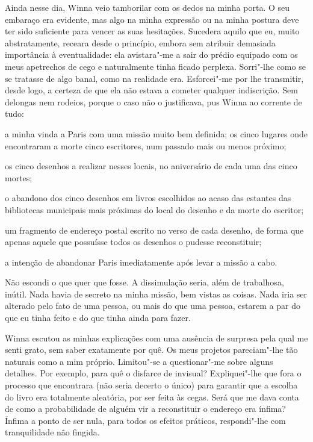 Ainda nesse dia, Winna veio tamborilar com os dedos na minha porta. O
seu embaraço era evidente, mas algo na minha expressão ou na minha
postura deve ter sido suficiente para vencer as suas hesitações.
Sucedera aquilo que eu, muito abstratamente, receara desde o princípio,
embora sem atribuir demasiada importância à eventualidade: ela avistara"-me
a sair do prédio equipado com os meus apetrechos de cego e
naturalmente tinha ficado perplexa. Sorri"-lhe como se se tratasse de
algo banal, como na realidade era. Esforcei"-me por lhe transmitir, desde
logo, a certeza de que ela não estava a cometer qualquer indiscrição.
Sem delongas nem rodeios, porque o caso não o justificava, pus Winna ao
corrente de tudo:

a minha vinda a Paris com uma missão muito bem definida; os cinco
lugares onde encontraram a morte cinco escritores, num passado mais ou menos próximo;

os cinco desenhos a realizar nesses locais, no aniversário de cada uma
das cinco mortes;

o abandono dos cinco desenhos em livros escolhidos ao acaso das estantes
das bibliotecas municipais mais próximas do local do desenho e da morte
do escritor;

um fragmento de endereço postal escrito no verso de cada desenho, de
forma que apenas aquele que possuísse todos os desenhos o pudesse
reconstituir;

a intenção de abandonar Paris imediatamente após levar a missão a cabo.

Não escondi o que quer que fosse. A dissimulação seria, além de
trabalhosa, inútil. Nada havia de secreto na minha missão, bem vistas as
coisas. Nada iria ser alterado pelo fato de uma pessoa, ou mais do que
uma pessoa, estarem a par do
que eu tinha feito e do que tinha ainda para fazer.

Winna escutou as minhas explicações com uma ausência de surpresa pela
qual me senti grato, sem saber exatamente por quê. Os meus projetos
pareciam"-lhe tão naturais como a mim próprio. Limitou"-se a questionar"-me
sobre alguns detalhes. Por exemplo, para quê o disfarce de invisual?
Expliquei"-lhe que fora o processo que encontrara (não seria decerto o único) para
garantir que a escolha do livro era totalmente aleatória, por ser feita
às cegas. Será que me dava conta de como a probabilidade de alguém vir a
reconstituir o endereço era ínfima? Ínfima a ponto de ser nula, para
todos os efeitos práticos, respondi"-lhe com tranquilidade não fingida.

